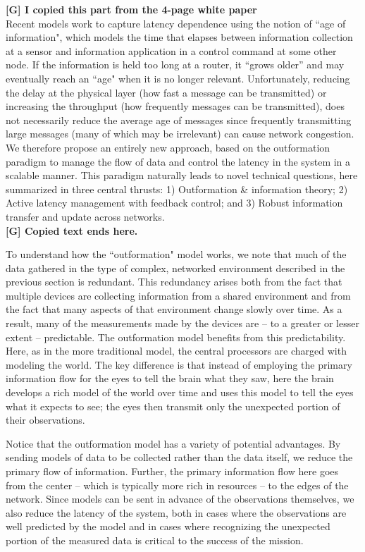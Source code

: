 \documentclass[12pt,letterpaper]{article}
\begin{document}
\textbf{[G] I copied this part from the 4-page white paper}\\
Recent models work to capture latency dependence using the notion of ``age of information", which models the time that elapses between information collection at a sensor and information application in a control command at some other node. If the information is held too long at a router, it “grows older” and may eventually reach an ``age" when it is no longer relevant. Unfortunately, reducing the delay at the physical layer (how fast a message can be transmitted) or increasing the throughput (how frequently messages can be transmitted), does not necessarily reduce the average age of messages since frequently transmitting large messages (many of which may be irrelevant) can cause network congestion. We therefore propose an entirely new approach, based on the outformation paradigm to manage the flow of data and control the latency in the system in a scalable manner. This paradigm naturally leads to novel technical questions, here summarized in three central thrusts: 1) Outformation \& information theory; 2) Active latency management with feedback control; and 3) Robust information transfer and update across networks.\\
\textbf{[G] Copied text ends here.}

To understand how the ``outformation" model works, we note that much of the data gathered in the type of complex, networked environment described in the previous section is redundant. This redundancy arises both from the fact that multiple devices are collecting information from a shared environment and from the fact that many aspects of that environment change slowly over time. As a result, many of the measurements made by the devices are -- to a greater or lesser extent -- predictable.  The outformation model benefits from this predictability. Here, as in the more traditional model, the central processors are charged with modeling the world. The key difference is that instead of employing the primary information flow for the eyes to tell the brain what they saw, here the brain develops a rich model of the world over time and uses this model to tell the eyes what it expects to see;  the eyes then transmit only the unexpected portion of their observations.

Notice that the outformation model has a variety of potential advantages. By sending models of data to be collected rather than the data itself, we reduce the primary flow of information. Further, the primary information flow here goes from the center -- which is typically more rich in resources -- to the edges of the network. Since models can be sent in advance of the observations themselves, we also reduce the latency of the system, both in cases where the observations are well predicted by the model and in cases where recognizing the unexpected portion of the measured data is critical to the success of the mission. 
\end{document}
